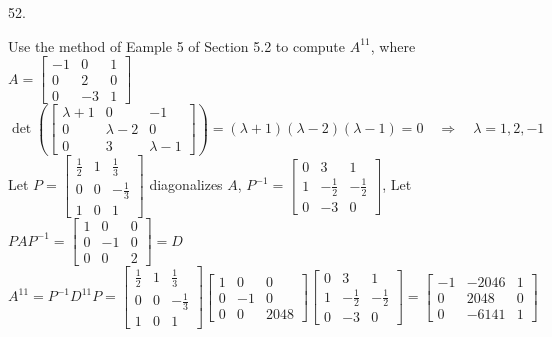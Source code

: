 \documentclass[12pt]{book}
\begin{document}
\begin{CJK}{UTF8}{bsmi}
52. \begin{minipage}[t]{\dimexpr\linewidth}
Use the method of Eample 5 of Section 5.2 to compute $A^{11}$, where $
A=\begin{bmatrix}
-1 & 0 & 1 \\
0 & 2 & 0 \\
0 & -3 & 1
\end{bmatrix}$ \\
$\det (\begin{bmatrix}
\lambda+1 & 0 & -1 \\
0 & \lambda-2 & 0 \\
0 & 3 & \lambda-1
\end{bmatrix})=(\lambda+1)(\lambda-2)(\lambda-1)=0
\quad\Rightarrow\quad \lambda=1,2,-1$ \\
Let $P=\begin{bmatrix}
\frac{1}{2} & 1 & \frac{1}{3} \\
0 & 0 & -\frac{1}{3} \\
1 & 0 & 1
\end{bmatrix}$ diagonalizes $A$, $P^{-1}=\begin{bmatrix}
0 & 3 & 1 \\
1 & -\frac{1}{2} & -\frac{1}{2} \\
0 & -3 & 0
\end{bmatrix}$, Let $PAP^{-1}=\begin{bmatrix}
1 & 0 & 0 \\
0 & -1 & 0 \\
0 & 0 & 2
\end{bmatrix}=D$ \\
$A^{11}=P^{-1}D^{11}P=\begin{bmatrix}
\frac{1}{2} & 1 & \frac{1}{3} \\
0 & 0 & -\frac{1}{3} \\
1 & 0 & 1
\end{bmatrix}\begin{bmatrix}
1 & 0 & 0 \\
0 & -1 & 0 \\
0 & 0 & 2048
\end{bmatrix}\begin{bmatrix}
0 & 3 & 1 \\
1 & -\frac{1}{2} & -\frac{1}{2} \\
0 & -3 & 0
\end{bmatrix}=\begin{bmatrix}
-1 & -2046 & 1 \\
0 & 2048 & 0 \\
0 & -6141 & 1
\end{bmatrix}$
\end{minipage}


\end{CJK}
\end{document}

